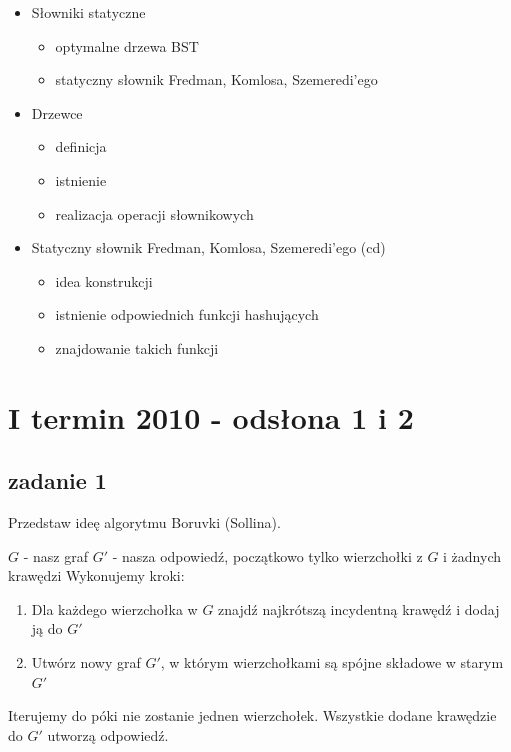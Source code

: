 \documentclass[svgnames]{report}
\begin{document}
\begin{itemize}
\item Słowniki statyczne
\begin{itemize}
	\item optymalne drzewa BST
	\item statyczny słownik Fredman, Komlosa, Szemeredi'ego
\end{itemize}

\item{Drzewce}
\begin{itemize}
	\item definicja
	\item istnienie
	\item realizacja operacji słownikowych
\end{itemize}


\item Statyczny słownik Fredman, Komlosa, Szemeredi'ego (cd)
\begin{itemize}
	\item idea konstrukcji
	\item istnienie odpowiednich funkcji hashujących
	\item znajdowanie takich funkcji
\end{itemize}


\end{itemize}
\chapter{I termin 2010 - odsłona 1 i 2}
\section{zadanie 1}
\begin{framed}
Przedstaw ideę algorytmu Boruvki (Sollina).
\end{framed}
$G$ - nasz graf
$G'$ - nasza odpowiedź, początkowo tylko wierzchołki z $G$ i żadnych krawędzi
Wykonujemy kroki:
\begin{enumerate}
\item Dla każdego wierzchołka w $G$ znajdź najkrótszą incydentną krawędź i dodaj ją do $G'$
\item Utwórz nowy graf $G'$, w którym wierzchołkami są spójne składowe w starym $G'$
 \end{enumerate}
Iterujemy do póki nie zostanie jednen wierzchołek. Wszystkie dodane krawędzie do $G'$ utworzą odpowiedź.
\end{document}
